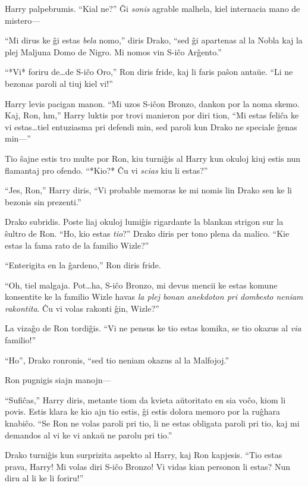 Harry palpebrumis. ``Kial ne?'' Ĝi \emph{sonis} agrable malhela, kiel
internacia mano de mistero—

``Mi dirus ke ĝi estas \emph{bela} nomo,'' diris Drako, ``sed ĝi
apartenas al la Nobla kaj la plej Maljuna Domo de Nigro. Mi nomos vin
S-iĉo Arĝento.''

``*Vi* foriru de\ldots de S-iĉo Oro,'' Ron diris fride, kaj li faris paŝon
antaŭe. ``Li ne bezonas paroli al tiuj kiel vi!''

Harry levis pacigan manon. ``Mi uzos S-iĉon Bronzo, dankon por la noma
skemo. Kaj, Ron, hm,'' Harry luktis por trovi manieron por diri tion,
``Mi estas feliĉa ke vi estas\ldots tiel entuziasma pri defendi min,
sed paroli kun Drako ne speciale ĝenas min—''


Tio ŝajne estis tro multe por Ron, kiu turniĝis al Harry kun okuloj
kiuj estis nun flamantaj pro ofendo. ``*Kio?* Ĉu vi \emph{scias} kiu
li estas?''

``Jes, Ron,'' Harry diris, ``Vi probable memoras ke mi nomis lin Drako
sen ke li bezonis sin prezenti.''

Drako subridis. Poste liaj okuloj lumiĝis rigardante la blankan
strigon sur la ŝultro de Ron. ``Ho, kio estas \emph{tio}?'' Drako
diris per tono plena da malico. ``Kie estas la fama rato de la familio
Wizle?''

``Enterigita en la ĝardeno,'' Ron diris fride.

``Oh, tiel malgaja. Pot\ldots ha, S-iĉo Bronzo, mi devus mencii ke
estas komune konsentite ke la familio Wizle havas \emph{la plej
bonan anekdoton pri dombesto neniam rakontita}. Ĉu vi volas rakonti
ĝin, Wizle?''

La vizaĝo de Ron tordiĝis. ``Vi ne pensus ke tio estas komika, se tio
okazus al \emph{via} familio!''

``Ho'', Drako ronronis, ``sed tio neniam okazus al la Malfojoj.''

Ron pugnigis siajn manojn—

``Sufiĉas,'' Harry diris, metante tiom da kvieta aŭtoritato en sia
voĉo, kiom li povis. Estis klara ke kio ajn tio estis, ĝi estis dolora
memoro por la ruĝhara knabiĉo. ``Se Ron ne volas paroli pri tio, li ne
estas obligata paroli pri tio, kaj mi demandos al vi ke vi ankaŭ ne
parolu pri tio.''

Drako turniĝis kun surprizita aspekto al Harry, kaj Ron
kapjesis. ``Tio estas prava, Harry! Mi volas diri S-iĉo Bronzo! Vi
vidas kian personon li estas? Nun diru al li ke li foriru!''

